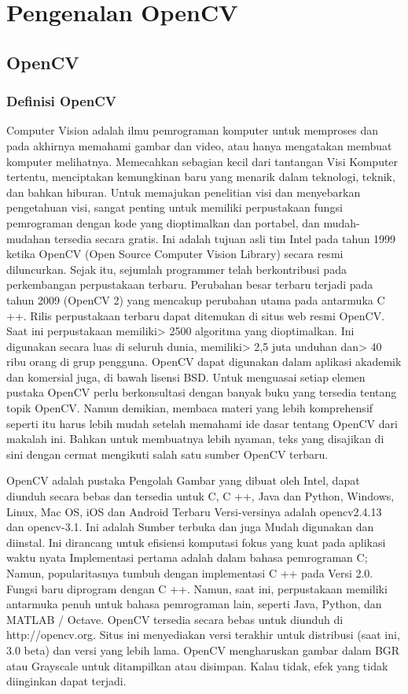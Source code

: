 \chapter{Pengenalan OpenCV}
\section{OpenCV}
\subsection{Definisi OpenCV}
	
	Computer Vision adalah ilmu pemrograman komputer untuk memproses dan pada akhirnya memahami gambar dan video, atau hanya mengatakan membuat komputer melihatnya. Memecahkan sebagian kecil dari tantangan Visi Komputer tertentu, menciptakan kemungkinan baru yang menarik dalam teknologi, teknik, dan bahkan hiburan. Untuk memajukan penelitian visi dan menyebarkan pengetahuan visi, sangat penting untuk memiliki perpustakaan fungsi pemrograman dengan kode yang dioptimalkan dan portabel, dan mudah-mudahan tersedia secara gratis. Ini adalah tujuan asli tim Intel pada tahun 1999 ketika OpenCV (Open Source Computer Vision Library) secara resmi diluncurkan. Sejak itu, sejumlah programmer telah berkontribusi pada perkembangan perpustakaan terbaru. Perubahan besar terbaru terjadi pada tahun 2009 (OpenCV 2) yang mencakup perubahan utama pada antarmuka C ++. Rilis perpustakaan terbaru dapat ditemukan di situs web resmi OpenCV. Saat ini perpustakaan memiliki> 2500 algoritma yang dioptimalkan. Ini digunakan secara luas di seluruh dunia, memiliki> 2,5 juta unduhan dan> 40 ribu orang di grup pengguna. OpenCV dapat digunakan dalam aplikasi akademik dan komersial juga, di bawah lisensi BSD. Untuk menguasai setiap elemen pustaka OpenCV perlu berkonsultasi dengan banyak buku yang tersedia tentang topik OpenCV. Namun demikian, membaca materi yang lebih komprehensif seperti itu harus lebih mudah setelah memahami ide dasar tentang OpenCV dari makalah ini. Bahkan untuk membuatnya lebih nyaman, teks yang disajikan di sini dengan cermat mengikuti salah satu sumber OpenCV terbaru.

	OpenCV adalah pustaka Pengolah Gambar yang dibuat oleh Intel, dapat diunduh secara bebas dan tersedia untuk C, C ++, Java dan Python, Windows, Linux, Mac OS, iOS dan Android Terbaru Versi-versinya adalah opencv2.4.13 dan opencv-3.1. Ini adalah Sumber terbuka dan juga Mudah digunakan dan diinstal. Ini dirancang untuk efisiensi komputasi fokus yang kuat pada aplikasi waktu nyata Implementasi pertama adalah dalam bahasa pemrograman C; Namun, popularitasnya tumbuh dengan implementasi C ++ pada Versi 2.0. Fungsi baru diprogram dengan C ++. Namun, saat ini, perpustakaan memiliki antarmuka penuh untuk bahasa pemrograman lain, seperti Java, Python, dan MATLAB / Octave. OpenCV tersedia secara bebas untuk diunduh di http://opencv.org. Situs ini menyediakan versi terakhir untuk distribusi (saat ini, 3.0 beta) dan versi yang lebih lama. OpenCV mengharuskan gambar dalam BGR atau Grayscale untuk ditampilkan atau disimpan. Kalau tidak, efek yang tidak diinginkan dapat terjadi.

